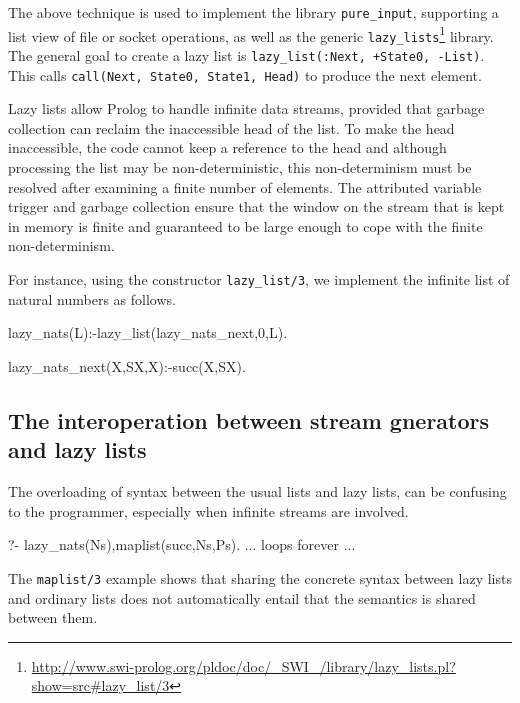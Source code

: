 \documentclass{new_tlp}
\begin{document}
The above technique is used to implement the library \texttt{pure\_input}, supporting a list view of file or socket operations, 
as well as the generic
\texttt{lazy\_lists}\footnote{\url{http://www.swi-prolog.org/pldoc/doc/_SWI_/library/lazy_lists.pl?show=src#lazy_list/3}}
library. The general goal to create a lazy list is
\texttt{lazy\_list(:Next, +State0, -List)}. This calls
\texttt{call(Next, State0, State1, Head)} to produce the next element.

Lazy lists allow Prolog to handle infinite data streams, provided that garbage
collection can reclaim the inaccessible head of the list. To make the
head inaccessible, the code cannot keep a reference to the head
and although processing the list may be non-deterministic,
this non-determinism must be resolved after examining a finite number of
elements.  The attributed variable trigger and garbage collection ensure
that the window on the stream that is kept in memory is finite and
guaranteed to be large enough to cope with the finite non-determinism.


For instance, 
using the constructor  {\tt lazy\_list/3}, we implement the infinite list of
natural numbers as follows.
\begin{code}
lazy_nats(L):-lazy_list(lazy_nats_next,0,L).

lazy_nats_next(X,SX,X):-succ(X,SX).
\end{code}


\subsection{The interoperation between stream gnerators and lazy lists}

The overloading of syntax between the usual lists and lazy lists, 
can be confusing to the
programmer, especially when infinite streams are involved.

\BX
\begin{codex}
?- lazy_nats(Ns),maplist(succ,Ns,Ps).
... loops forever ...
\end{codex}
\EX
The {\tt maplist/3} example
 shows that sharing the concrete syntax between lazy lists and  ordinary lists
does not automatically entail that the semantics is shared between them.
\end{document}
